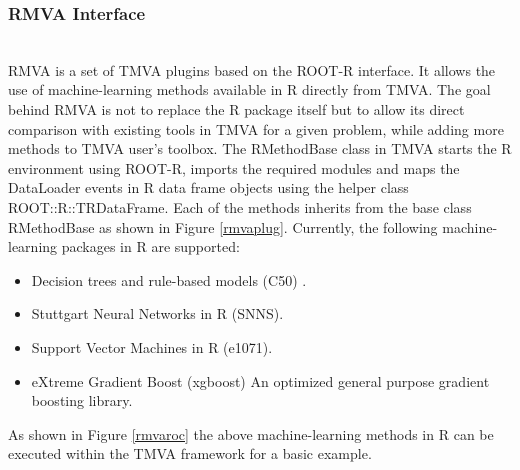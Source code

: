 \documentclass[a4paper]{jpconf}
\begin{document}
\subsubsection{RMVA Interface}\label{RMVA}\hspace*{\fill} \\
RMVA is a set of TMVA plugins based on the ROOT-R interface. It allows the use of machine-learning methods available in R directly from TMVA. The goal behind RMVA is not to replace the R package itself but to allow its direct comparison with existing tools in TMVA for a given problem, while adding more methods to TMVA user’s toolbox.\newline\newline
The RMethodBase class in TMVA starts the R environment using ROOT-R, imports the required modules and maps the DataLoader events in R data frame objects using the helper class ROOT::R::TRDataFrame.
Each of the methods inherits from the base class RMethodBase as shown in Figure \ref{rmvaplug}. 
Currently, the following machine-learning packages in R are supported: 
\begin{itemize}  
\item Decision trees and rule-based models (C50) \cite{c50}.
\item Stuttgart Neural Networks in R (SNNS)\cite{rsnns}.
\item Support Vector Machines in R (e1071)\cite{e1071}.
\item eXtreme Gradient Boost (xgboost) An optimized general purpose gradient boosting library\cite{chen2015xgboost}.
\end{itemize}
As shown in Figure \ref{rmvaroc} the above machine-learning methods in R can be executed within the TMVA framework for a basic example.
\end{document}
